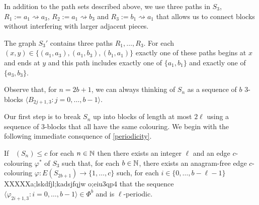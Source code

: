 \documentclass{patmorin}
\DeclareMathOperator{\afci}{\overline{\chi}_\pi}
\begin{document}
In addition to the path sets described above, we use three paths in $S_3$, $R_1:=a_1\rightsquigarrow a_3$, $R_2:=a_1\rightsquigarrow b_3$ and $R_3:=b_1\rightsquigarrow a_1$ that allows us to connect blocks without interfering with larger adjacent pieces.

\begin{lem}
    The graph $S_3'$ contains three paths $R_1,\ldots,R_3$. For each $(x,y)\in\{(a_1,a_3),(a_1,b_3),(b_1,a_1)\}$ exactly one of these paths begins at $x$ and ends at $y$ and this path includes exactly one of $\{a_1,b_1\}$ and exactly one of $\{a_3,b_3\}$.
\end{lem}

Observe that, for $n=2b+1$, we can always thinking of $S_n$ as a sequence of $b$ $3$-blocks $\langle B_{2j+1,3}: j=0,\ldots,b-1\rangle$.


Our first step is to break $S_n$ up into blocks of length at most $2\ell$ using a sequence of $3$-blocks that all have the same colouring.  We begin with the following immediate consquence of \cref{periodicity}.

\begin{lem}\label{block_breaker}
    If $\afci(S_n)\le c$ for each $n\in\mathbb{N}$ then there exists an integer $\ell$ and an edge $c$-colouring $\varphi^*$ of $S_3$ such that, for each $b\in\mathbb{N}$, there exists an anagram-free edge $c$-colouring $\varphi:E(S_{2b+1})\to\{1,\ldots,c\}$ such, for each $i\in\{0,\ldots,b-\ell-1\}$ XXXXXa;lskdfjl;kadsjfqjw o;eiu3qp4 that the sequence $\langle \varphi_{2i+1,3}:i=0,\ldots,b-1\rangle\in\Phi^b$ and is $\ell$-periodic.
\end{lem}
\end{document}
